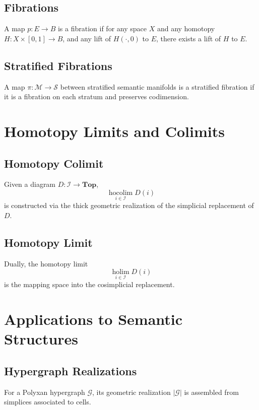 \subsection{Fibrations}

A map $p:E\to B$ is a fibration if for any space $X$ and any homotopy $H:X\times[0,1]\to B$, and any lift of $H(\cdot,0)$ to $E$, there exists a lift of $H$ to $E$.

\subsection{Stratified Fibrations}

A map $\pi:\mathcal{M}\to \mathcal{S}$ between stratified semantic manifolds is a stratified fibration if it is a fibration on each stratum and preserves codimension.

\section{Homotopy Limits and Colimits}

\subsection{Homotopy Colimit}

Given a diagram $D:\mathcal{I}\to \mathbf{Top}$,
\[
\operatorname*{hocolim}_{i\in\mathcal{I}} D(i)
\]
is constructed via the thick geometric realization of the simplicial replacement of $D$.

\subsection{Homotopy Limit}

Dually, the homotopy limit
\[
\operatorname*{holim}_{i\in\mathcal{I}} D(i)
\]
is the mapping space into the cosimplicial replacement.

\section{Applications to Semantic Structures}

\subsection{Hypergraph Realizations}

For a Polyxan hypergraph $\mathcal{G}$, its geometric realization $|\mathcal{G}|$ is assembled from simplices associated to cells.

